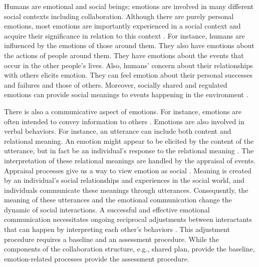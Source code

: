 Humans are emotional and social beings; emotions are involved in many different
social contexts including collaboration. Although there are purely personal
emotions, most emotions are importantly experienced in a social context and
acquire their significance in relation to this context
\cite{parkinson:emotion-social-interaction}. For instance, humans are influenced
by the emotions of those around them. They also have emotions about the actions
of people around them. They have emotions about the events that occur in the other
people's lives. Also, humans' concern about their relationships with others
elicits emotion. They can feel emotion about their personal successes and
failures and those of others. Moreover, socially shared and regulated emotions
can provide social meanings to events happening in the environment
\cite{wisecup:sociology-emotions}. 

There is also a communicative aspect of emotions. For instance, emotions are
often intended to convey information to others \cite{goffman:self-presentation}.
Emotions are also involved in verbal behaviors. For instance, an utterance can
include both content and relational meaning. An emotion might appear to be
elicited by the content of the utterance, but in fact be an individual's
response to the relational meaning \cite{planalp:communicating-emotion}. The
interpretation of these relational meanings are handled by the appraisal of
events. Appraisal processes give us a way to view emotion as social
\cite{hooft:sharing-emotions}. Meaning is created by an individual's social
relationships and experiences in the social world, and individuals communicate
these meanings through utterances. Consequently, the meaning of these utterances
and the emotional communication change the dynamic of social interactions. A
successful and effective emotional communication necessitates ongoing reciprocal
adjustments between interactants that can happen by interpreting each other's
behaviors \cite{parkinson:emotion-social-interaction}. This adjustment procedure
requires a baseline and an assessment procedure. While the components of the
collaboration structure, e.g., shared plan, provide the baseline,
emotion-related processes provide the assessment procedure.

